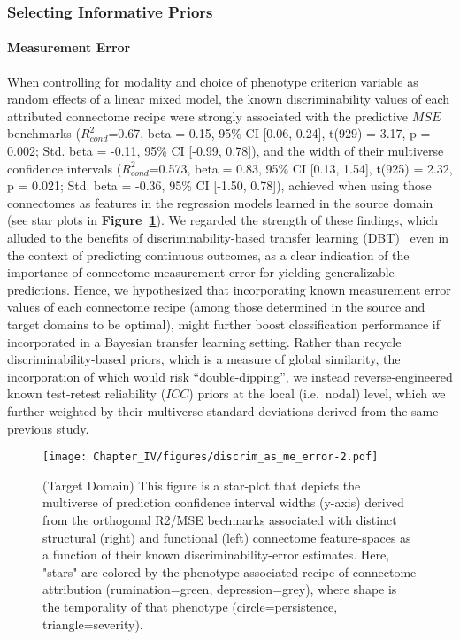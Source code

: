 \documentclass[
  notitlepage]{article}
\begin{document}
\hypertarget{selecting-informative-priors}{%
\subsubsection{Selecting Informative
Priors}\label{selecting-informative-priors}}
\hypertarget{measurement-error}{%
\paragraph{Measurement Error}\label{measurement-error}}
When controlling for modality and choice of phenotype criterion variable
as random effects of a linear mixed model, the known discriminability
values of each attributed connectome recipe were strongly associated
with the predictive \(MSE\) benchmarks (\(R^{2}_{cond}\)=0.67, beta =
0.15, 95\% CI {[}0.06, 0.24{]}, t(929) = 3.17, p = 0.002; Std. beta =
-0.11, 95\% CI {[}-0.99, 0.78{]}), and the width of their multiverse
confidence intervals (\(R^{2}_{cond}\)=0.573, beta = 0.83, 95\% CI
{[}0.13, 1.54{]}, t(925) = 2.32, p = 0.021; Std. beta = -0.36, 95\% CI
{[}-1.50, 0.78{]}), achieved when using those connectomes as features in
the regression models learned in the source domain (see star plots in
\textbf{Figure~\ref{fig:discrim_as_me_errorCI}}). We regarded the strength of
these findings, which alluded to the benefits of discriminability-based
transfer learning (DBT)~\cite{Pratt1993} even in the
context of predicting continuous outcomes, as a clear indication of the
importance of connectome measurement-error for yielding generalizable
predictions. Hence, we hypothesized that incorporating known measurement
error values of each connectome recipe (among those determined in the
source and target domains to be optimal), might further boost
classification performance if incorporated in a Bayesian transfer
learning setting. Rather than recycle discriminability-based priors,
which is a measure of global similarity, the incorporation of which
would risk ``double-dipping'', we instead reverse-engineered known
test-retest reliability (\(ICC\)) priors at the local (i.e.~nodal)
level, which we further weighted by their multiverse standard-deviations
derived from the same previous study.

\begin{figure}
\centering
\texttt{[image: Chapter\_IV/figures/discrim\_as\_me\_error-2.pdf]}
\caption{(Target Domain) \label{fig:discrim_as_me_errorCI}\scriptsize{This figure is a star-plot that depicts the multiverse of prediction confidence interval widths (y-axis) derived from the orthogonal R2/MSE bechmarks associated with distinct structural (right) and functional (left) connectome feature-spaces as a function of their known discriminability-error estimates. Here, "stars" are colored by the phenotype-associated recipe of connectome attribution (rumination=green, depression=grey), where shape is the temporality of that phenotype (circle=persistence, triangle=severity).}}
\end{figure}
\setlength{\belowcaptionskip}{-10pt}
\end{document}
